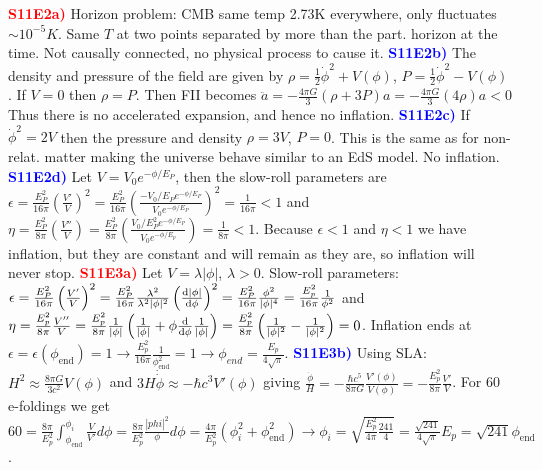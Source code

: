 \documentclass[landscape, a4paper,1pt,english]{article}
\begin{document}
{{{\begin{multicols}{5}
\textcolor{red}{\textbf{S11E2a)}} Horizon problem:
CMB same temp 2.73K everywhere, only fluctuates $\sim10^{-5}K$. Same $T$ at two points separated by more than the part. horizon at the time. Not causally connected, no physical process to cause it. 
\textcolor{blue}{\textbf{S11E2b)}} The density and pressure of the field are given by
$\rho = \frac{1}{2}\dot{\phi}^2 + V(\phi)$, $P = \frac{1}{2}\dot{\phi}^2 - V(\phi)$. If $V = 0$ then $\rho = P$. Then FII becomes
$\ddot{a} = -\frac{4\pi G}{3}\left(\rho + 3P\right)a = -\frac{4\pi G}{3}\left(4\rho\right)a <0$ Thus there is no accelerated expansion, and hence no inflation.
\textcolor{blue}{\textbf{S11E2c)}} If $\dot{\phi}^2 = 2V$ then the pressure and density 
$\rho = 3V$, $P = 0$. This is the same as for non-relat. matter making the universe behave similar to an EdS model. No inflation.
\textcolor{blue}{\textbf{S11E2d)}} Let $V = V_0 e^{-\phi/E_P}$, then the slow-roll parameters are $\epsilon = \frac{E_P^2}{16\pi}\left(\frac{V'}{V}\right)^2 = \frac{E_P^2}{16\pi}\left(\frac{-V_0/E_P e^{-\phi/E_P}}{V_0 e^{-\phi/E_P}}\right)^2 = \frac{1}{16\pi}<1$ and $\eta = \frac{E_P^2}{8\pi}\left(\frac{V''}{V}\right) = \frac{E_P^2}{8\pi}\left(\frac{V_0/E_P^2 e^{-\phi/E_P}}{V_0e^{-\phi/E_p}}\right) = \frac{1}{8\pi} <1$. Because $\epsilon<1$ and $\eta<1$ we have inflation, but they are constant and will remain as they are, so inflation will never stop.
\textcolor{red}{\textbf{S11E3a)}} Let $V = \lambda|\phi|$, $\lambda>0$. Slow-roll parameters:
$\epsilon = \frac{E_P^2}{16\pi}\left(\frac{V'}{V}\right)^2 = \frac{E_P^2}{16\pi}\frac{\lambda^2}{\lambda^2|\phi|^2}\left(\dv{|\phi|}{\phi}\right)^2 = \frac{E_P^2}{16\pi}\frac{\phi^2}{|\phi|^4} = \frac{E_p^2}{16\pi}\frac{1}{\phi^2}$ and $\eta = \frac{E_p^2}{8\pi}\frac{V''}{V} = \frac{E_p^2}{8\pi}\frac{1}{|\phi|}\left(\frac{1}{|\phi|}+\phi\dv{\phi}\frac{1}{|\phi|}\right) = \frac{E_p^2}{8\pi}\left(\frac{1}{|\phi|^2}-\frac{1}{|\phi|^2}\right) = 0$.  Inflation ends at $\epsilon = \epsilon(\phi_\text{end}) = 1\rightarrow\frac{E_p^2}{16\pi}\frac{1}{\phi_\text{end}^2} = 1\rightarrow \phi_{end} = \frac{E_p}{4\sqrt{\pi}}$.
\textcolor{blue}{\textbf{S11E3b)}} Using SLA: $H^2\approx \frac{8\pi G}{3c^2}V(\phi)$ and $3H\dot{\dot{\phi}}\approx-\hbar c^3V'(\phi)$ giving $\frac{\dot{\phi}}{H} = -\frac{\hbar c^5}{8\pi G}\frac{V'(\phi)}{V(\phi)} = -\frac{E_p^2}{8\pi}\frac{V'}{V}$. For 60 e-foldings we get $60 = \frac{8\pi}{E_p^2}\int_{\phi_\text{end}}^{\phi_i}\frac{V}{V'}d\phi = \frac{8\pi}{E_p^2}\frac{|phi|^2}{\phi}d\phi = \frac{4\pi}{E_p^2}(\phi_i^2 + \phi_\text{end}^2)\rightarrow \phi_i = \sqrt{\frac{E_p^2}{4\pi}\frac{241}{4}} = \frac{\sqrt{241}}{4\sqrt{\pi}}E_p = \sqrt{241}\phi_\text{end}$.

\end{multicols}}}}
\end{document}

